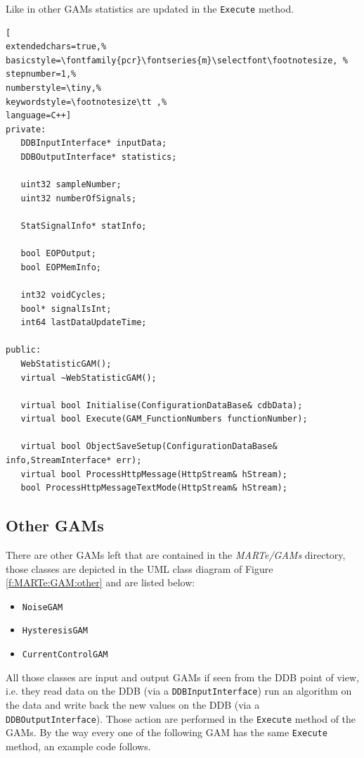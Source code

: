 Like in other GAMs statistics are updated in the \texttt{Execute} method.
\begin{lstlisting}[
extendedchars=true,%
basicstyle=\fontfamily{pcr}\fontseries{m}\selectfont\footnotesize, %
stepnumber=1,%
numberstyle=\tiny,%
keywordstyle=\footnotesize\tt ,%
language=C++]
private:
   DDBInputInterface* inputData;
   DDBOutputInterface* statistics;

   uint32 sampleNumber;
   uint32 numberOfSignals;

   StatSignalInfo* statInfo;

   bool EOPOutput;
   bool EOPMemInfo;

   int32 voidCycles;
   bool* signalIsInt;
   int64 lastDataUpdateTime;

public:
   WebStatisticGAM();
   virtual ~WebStatisticGAM();

   virtual bool Initialise(ConfigurationDataBase& cdbData);
   virtual bool Execute(GAM_FunctionNumbers functionNumber);

   virtual bool ObjectSaveSetup(ConfigurationDataBase& info,StreamInterface* err);
   virtual bool ProcessHttpMessage(HttpStream& hStream);
   bool ProcessHttpMessageTextMode(HttpStream& hStream);
\end{lstlisting}



\subsection{Other GAMs}
There are other GAMs left that are contained in the \textit{MARTe/GAMs} directory, those classes are depicted in the UML class diagram of Figure \ref{f:MARTe:GAM:other} and are listed below:
\begin{itemize}
 \item \texttt{NoiseGAM}
 \item \texttt{HysteresisGAM}
 \item \texttt{CurrentControlGAM}
\end{itemize}

All those classes are input and output GAMs if seen from the DDB point of view, i.e. they read data on the DDB (via a \texttt{DDBInputInterface}) run an algorithm on the data and write back the new values on the DDB (via a \texttt{DDBOutputInterface}). Those action are performed in the \texttt{Execute} method of the GAMs. By the way every one of the following GAM has the same \texttt{Execute} method, an example code follows.

